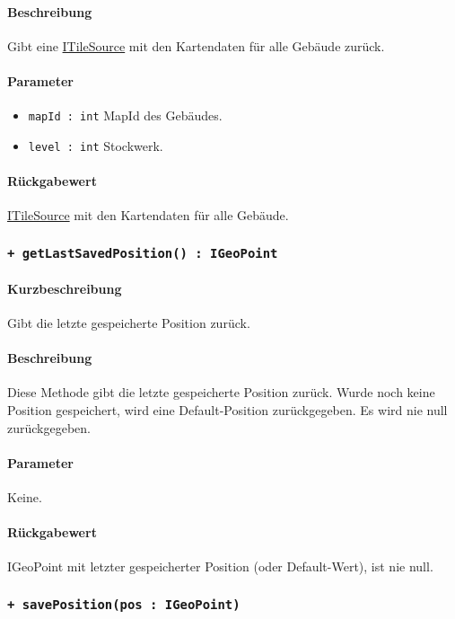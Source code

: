 \paragraph*{Beschreibung}
Gibt eine \href{https://osmdroid.github.io/osmdroid/javadocAll/org/osmdroid/tileprovider/tilesource/ITileSource.html}
{ITileSource} mit den Kartendaten für alle Gebäude zurück.
\paragraph*{Parameter}
\begin{itemize}
    \item \texttt{mapId : int} MapId des Gebäudes.
    \item \texttt{level : int} Stockwerk.
\end{itemize}
\paragraph*{Rückgabewert}
\href{https://osmdroid.github.io/osmdroid/javadocAll/org/osmdroid/tileprovider/tilesource/ITileSource.html}
{ITileSource} mit den Kartendaten für alle Gebäude.

\subsubsection*{\texttt{+ getLastSavedPosition() : IGeoPoint}}%
\paragraph*{Kurzbeschreibung}
Gibt die letzte gespeicherte Position zurück.
\paragraph*{Beschreibung}
Diese Methode gibt die letzte gespeicherte Position zurück. Wurde noch keine Position gespeichert,
wird eine Default-Position zurückgegeben. Es wird nie null zurückgegeben.
\paragraph*{Parameter}
Keine.
\paragraph*{Rückgabewert}
IGeoPoint mit letzter gespeicherter Position (oder Default-Wert), ist nie null.

\subsubsection*{\texttt{+ savePosition(pos : IGeoPoint)}}%
